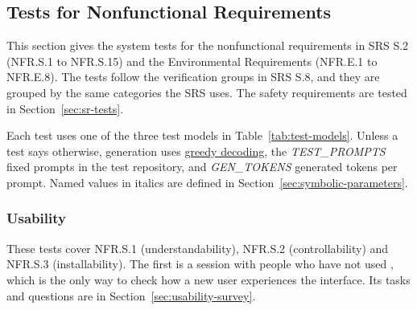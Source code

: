 \documentclass[12pt, titlepage]{article}
\providecommand{\glink}[2]{\hyperlink{gls:#1}{#2}}
\begin{document}
\subsection{Tests for Nonfunctional Requirements}
\label{sec:nfr-tests}
\begingroup
\raggedright
\setlength{\parindent}{15pt}

This section gives the system tests for the nonfunctional requirements in SRS
S.2 (NFR.S.1 to NFR.S.15) and the Environmental Requirements (NFR.E.1 to
NFR.E.8). The tests follow the verification groups in SRS S.8, and they are
grouped by the same categories the SRS uses. The safety requirements are tested
in Section~\ref{sec:sr-tests}.

Each test uses one of the three test models in
Table~\ref{tab:test-models}. Unless a test says otherwise, generation uses \glink{greedy}{greedy decoding}, the
\textit{TEST\_PROMPTS} fixed prompts in the test repository, and
\textit{GEN\_TOKENS} generated tokens per prompt. Named values in italics are
defined in Section~\ref{sec:symbolic-parameters}.

\subsubsection{Usability}

These tests cover NFR.S.1 (understandability), NFR.S.2 (controllability) and
NFR.S.3 (installability). The first is a session with people who have not used
\progname{}, which is the only way to check how a new user experiences the
interface. Its tasks and questions are in Section~\ref{sec:usability-survey}.
\end{document}
